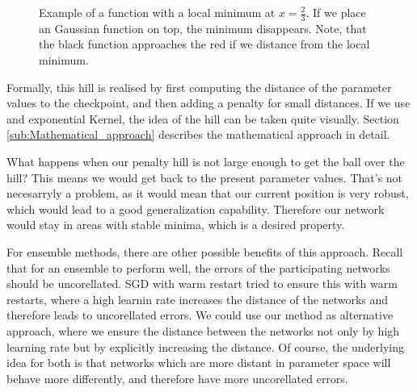 \begin{figure}[h!]\label{fig:Distance2D}
    \begin{center}
        \caption{Example of a function with a local minimum at $x=\frac{2}{3}$. If we place an Gaussian function on top, the minimum disappears. Note, that the black function approaches the red if we distance from the local minimum.}
    \end{center}
\end{figure}

Formally, this hill is realised by first computing the distance of the parameter
values to the checkpoint, and then adding a penalty for small distances. If we
use and exponential Kernel, the idea of the hill can be taken quite visually.
Section \ref{sub:Mathematical_approach} describes the mathematical approach in
detail.

What happens when our penalty hill is not large enough to get the ball over the
hill? This means we would get back to the present parameter values. That's not
necesarryly a problem, as it would mean that our current position is very
robust, which would lead to a good generalization capability. Therefore our
network would stay in areas with stable minima, which is a desired property.

For ensemble methods, there are other possible benefits of this approach. Recall
that for an ensemble to perform well, the errors of the participating networks
should be uncorellated. SGD with warm restart \cite{loshchilov2016sgdr} tried to
ensure this with warm restarts, where a high learnin rate increases the distance
of the networks and therefore leads to uncorellated errors. We could use our
method as alternative approach, where we ensure the distance between the
networks not only by high learning rate but by explicitly increasing the
distance. Of course, the underlying idea for both is that networks which are
more distant in parameter space will behave more differently, and therefore have
more uncorellated errors.




